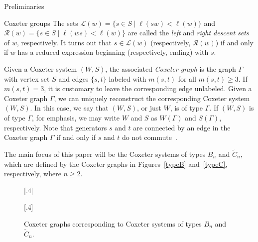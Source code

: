 \documentclass[11pt]{amsart}
\theoremstyle{definition}
\numberwithin{equation}{section}
\newcommand{\C}{\widetilde{C}}
\newcommand{\x}{\mathsf{x}}
\renewcommand{\L}{\mathcal{L}}
\newcommand{\R}{\mathcal{R}}
\renewcommand{\(}{\left(}
\renewcommand{\)}{\right)}
\begin{document}
\begin{section}{Preliminaries}
\begin{subsection}{Coxeter groups}
The sets $\L(w)=\{s \in S\mid \ell(sw) < \ell(w)\}$ and $\R(w)=\{s \in S\mid \ell(ws) < \ell(w)\}$ are called the \emph{left} and \emph{right descent sets} of $w$, respectively.  It turns out that $s \in \L(w)$ (respectively, $\R(w)$) if and only if $w$ has a reduced expression beginning (respectively, ending) with $s$.

Given a Coxeter system $(W,S)$, the associated \emph{Coxeter graph} is the graph $\Gamma$ with vertex set $S$ and edges $\{s,t\}$ labeled with $m(s,t)$ for all $m(s,t)\geq 3$.  If $m(s,t)=3$, it is customary to leave the corresponding edge unlabeled.  Given a Coxeter graph $\Gamma$, we can uniquely reconstruct the corresponding Coxeter system $(W,S)$.  In this case, we say that $(W,S)$, or just $W$, is of type $\Gamma$. If $(W,S)$ is of type $\Gamma$, for emphasis, we may write $W$ and $S$ as $W(\Gamma)$ and $S(\Gamma)$, respectively.  Note that generators $s$ and $t$ are connected by an edge in the Coxeter graph $\Gamma$ if and only if $s$ and $t$ do not commute~\cite{Humphreys1990}.

The main focus of this paper will be the Coxeter systems of types $B_n$ and $\C_n$, which are defined by the Coxeter graphs in Figures~\ref{typeB} and~\ref{typeC}, respectively, where $n\geq 2$.

\begin{figure}[!ht]
[.4\textwidth]{
}
\subcaptionbox{Type $\C_n$\label{typeC}}[.4\textwidth]{
}
\caption{Coxeter graphs corresponding to Coxeter systems of types $B_{n}$ and $\C_{n}$.}
\end{figure}


\end{subsection}
\end{section}
\end{document}
